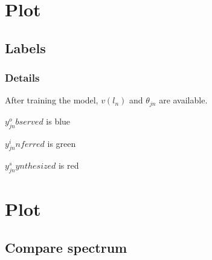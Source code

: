 \documentclass{beamer}
\begin{document}


\section{Plot} %

\subsection{Labels} %

\begin{frame}
\frametitle{Details}

After training the model, \(v(l_n)\) and \(\theta_{jn}\) are available.

\(y_{jn}^observed\) is blue


\(y_{jn}^inferred\) is green


\(y_{jn}^synthesized\) is red



\end{frame}




\section{Plot} %

\subsection{Compare spectrum} %
\end{document}
